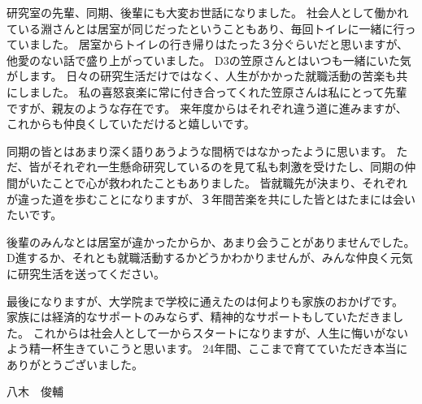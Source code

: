 研究室の先輩、同期、後輩にも大変お世話になりました。
社会人として働かれている淵さんとは居室が同じだったということもあり、毎回トイレに一緒に行っていました。
居室からトイレの行き帰りはたった３分ぐらいだと思いますが、他愛のない話で盛り上がっていました。
D3の笠原さんとはいつも一緒にいた気がします。
日々の研究生活だけではなく、人生がかかった就職活動の苦楽も共にしました。
私の喜怒哀楽に常に付き合ってくれた笠原さんは私にとって先輩ですが、親友のような存在です。
来年度からはそれぞれ違う道に進みますが、これからも仲良くしていただけると嬉しいです。

同期の皆とはあまり深く語りあうような間柄ではなかったように思います。
ただ、皆がそれぞれ一生懸命研究しているのを見て私も刺激を受けたし、同期の仲間がいたことで心が救われたこともありました。
皆就職先が決まり、それぞれが違った道を歩むことになりますが、３年間苦楽を共にした皆とはたまには会いたいです。

後輩のみんなとは居室が違かったからか、あまり会うことがありませんでした。
D進するか、それとも就職活動するかどうかわかりませんが、みんな仲良く元気に研究生活を送ってください。

最後になりますが、大学院まで学校に通えたのは何よりも家族のおかげです。
家族には経済的なサポートのみならず、精神的なサポートもしていただきました。
これからは社会人として一からスタートになりますが、人生に悔いがないよう精一杯生きていこうと思います。
24年間、ここまで育てていただき本当にありがとうございました。
\begin{flushright}
八木　俊輔
\end{flushright}
